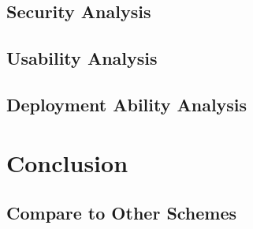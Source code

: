 \begin{CJK}{Bg5}{bsmi}
\section{Security Analysis}

\section{Usability Analysis}

\section{Deployment Ability Analysis}

\chapter{Conclusion}

\section{Compare to Other Schemes}

\end{CJK}
